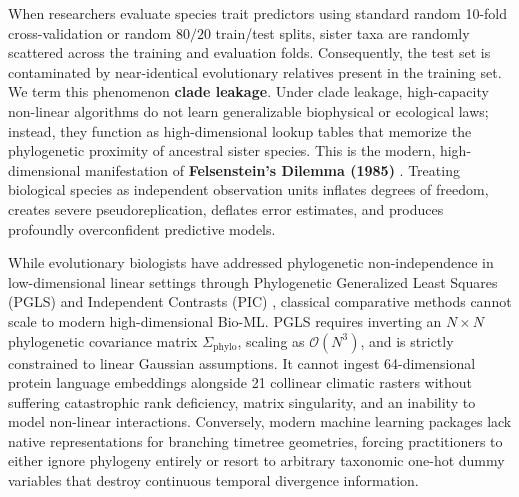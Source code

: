 \documentclass[sigconf,nonacm]{acmart}
\begin{document}
When researchers evaluate species trait predictors using standard random 10-fold cross-validation or random $80/20$ train/test splits, sister taxa are randomly scattered across the training and evaluation folds. Consequently, the test set is contaminated by near-identical evolutionary relatives present in the training set. We term this phenomenon \textbf{clade leakage}. Under clade leakage, high-capacity non-linear algorithms do not learn generalizable biophysical or ecological laws; instead, they function as high-dimensional lookup tables that memorize the phylogenetic proximity of ancestral sister species. This is the modern, high-dimensional manifestation of \textbf{Felsenstein's Dilemma (1985)} \cite{felsenstein1985phylogenies}. Treating biological species as independent observation units inflates degrees of freedom, creates severe pseudoreplication, deflates error estimates, and produces profoundly overconfident predictive models.

While evolutionary biologists have addressed phylogenetic non-independence in low-dimensional linear settings through Phylogenetic Generalized Least Squares (PGLS) \cite{martins1997phylogenies} and Independent Contrasts (PIC) \cite{felsenstein1985phylogenies}, classical comparative methods cannot scale to modern high-dimensional Bio-ML. PGLS requires inverting an $N \times N$ phylogenetic covariance matrix $\Sigma_{\text{phylo}}$, scaling as $\mathcal{O}(N^3)$, and is strictly constrained to linear Gaussian assumptions. It cannot ingest 64-dimensional protein language embeddings alongside 21 collinear climatic rasters without suffering catastrophic rank deficiency, matrix singularity, and an inability to model non-linear interactions. Conversely, modern machine learning packages lack native representations for branching timetree geometries, forcing practitioners to either ignore phylogeny entirely or resort to arbitrary taxonomic one-hot dummy variables that destroy continuous temporal divergence information.
\end{document}
